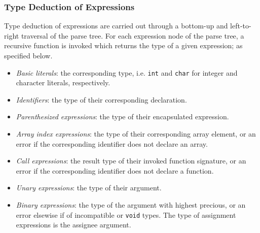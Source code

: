 \subsubsection{Type Deduction of Expressions}

Type deduction of expressions are carried out through a bottom-up and left-to-right traversal of the parse tree. For each expression node of the parse tree, a recursive function is invoked which returns the type of a given expression; as specified below.

\begin{itemize}
	\item \textit{Basic literals}: the corresponding type, i.e. \texttt{int} and \texttt{char} for integer and character literals, respectively.
	\item \textit{Identifiers}: the type of their corresponding declaration.
	\item \textit{Parenthesized expressions}: the type of their encapsulated expression.
	\item \textit{Array index expressions}: the type of their corresponding array element, or an error if the corresponding identifier does not declare an array.
	\item \textit{Call expressions}: the result type of their invoked function signature, or an error if the corresponding identifier does not declare a function.
	\item \textit{Unary expressions}: the type of their argument.
	\item \textit{Binary expressions}: the type of the argument with highest precious, or an error elsewise if of incompatible or \texttt{void} types. The type of assignment expressions is the assignee argument.
\end{itemize}
